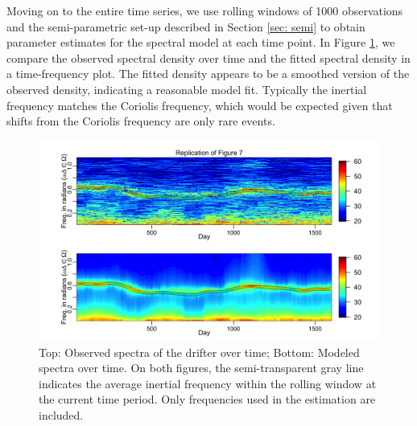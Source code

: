 \documentclass{stat572Style}
\begin{document}
\par
Moving on to the entire time series, we use rolling windows of 1000 observations and the semi-parametric set-up described in Section \ref{sec: semi}  to obtain parameter estimates for the spectral model at each time point.
 In Figure \ref{fig:timeVarying}, we compare the observed spectral density over time and the fitted spectral density in a time-frequency plot. 
  The fitted density appears to be a smoothed version of the observed density,  indicating a reasonable model fit.
   Typically the inertial frequency matches the Coriolis frequency, which would be expected given that shifts from the Coriolis frequency are only rare events.
   
   \begin{figure}[h!]
  \centering
    \includegraphics[width=.95\textwidth]{ReplicatedFigures/fig7.png}
        \caption{Top: Observed spectra of the drifter over time; Bottom: Modeled spectra over time. On both figures, the semi-transparent gray line indicates the average inertial frequency within the rolling window at the current time period.  Only frequencies used in the estimation are included.  }
        	\label{fig:timeVarying}
\end{figure}
\end{document}
